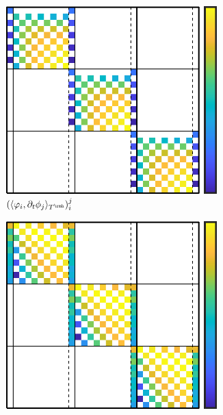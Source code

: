 \begin{example}
        \begin{figure}[!ht]
            \centering
            \begin{subfigure}{0.5\textwidth}
                \centering
                \includegraphics[width = 0.9\textwidth]{2 - fluid component/2 - structure preservation/2 - FET/1 - heat equation/images/matrix 1.png}
                \caption{$(\langle\varphi_{i}, \partial_{t}\phi_{j}\rangle_{T^{\rmh}})^{j}_{i}$}
            \end{subfigure}%
            \begin{subfigure}{0.5\textwidth}
                \centering
                \includegraphics[width = 0.9\textwidth]{2 - fluid component/2 - structure preservation/2 - FET/1 - heat equation/images/matrix 2.png}

\end{subfigure}
\end{figure}
\end{example}
